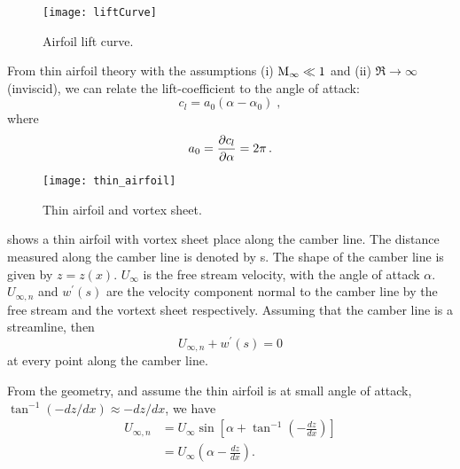 \begin{figure}[!h!]
  \begin{center}
    \texttt{[image: liftCurve]}
    \caption{\label{FIG_LIFT_CURVE}Airfoil lift curve.}
  \end{center}
\end{figure}

From thin airfoil theory \cite{ANDERSON_INTRO_TO_FLIGHT_BOOK2012} with the assumptions (i) ${\rm{M}}_\infty\ll 1$ and (ii) $\Re\to\infty$ (inviscid), we can relate the lift-coefficient to the angle of attack:
\begin{equation}
  c_l = a_0(\alpha-\alpha_0)\;,
\end{equation}
where
\begin{equation}
  a_0 = {\frac{\partial c_l}{\partial \alpha}} = 2\pi \, \text{.}
\end{equation}

\begin{figure}[!h!]
  \begin{center}
    \texttt{[image: thin\_airfoil]}
    \caption{\label{FIG_THIN_AIRFOIL}Thin airfoil and vortex sheet.}
  \end{center}
\end{figure}

 shows a thin airfoil with vortex sheet place along the camber line. The distance measured along the camber line is denoted by s. The shape of the camber line is given by $z = z(x)$. $U_\infty$ is the free stream velocity, with the angle of attack $\alpha$. $U_{\infty, n}$ and $w^\prime(s)$ are the velocity component normal to the camber line by the free stream and the vortext sheet respectively. Assuming that the camber line is a streamline, then
\begin{equation}
	U_{\infty, n} + w^\prime(s) = 0 \label{eq:camber_n}
\end{equation}
at every point along the camber line.

From the geometry, and assume the thin airfoil is at small angle of attack, $\tan^{-1}\left(-dz/dx\right)\approx-dz/dx$, we have
\begin{align}
	U_{\infty, n} &= U_\infty \sin \left[ \alpha + \tan^{-1}\left(-\frac{dz}{dx}\right)\right] \\
	&= U_\infty \left(\alpha - \frac{dz}{dx}\right). \label{eq:U_inf_n}
\end{align}

